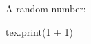 \documentclass{report}
\begin{document}
A random number:
\begin{luacode}
tex.print(1 + 1)
\end{luacode}
\end{document}
